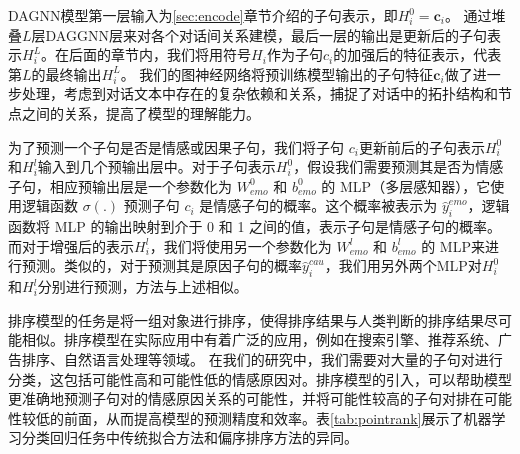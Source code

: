 DAGNN模型第一层输入为\ref{sec:encode}章节介绍的子句表示，即$H^0_i=\mathbf{c}_i$。 通过堆叠$L$层DAGGNN层来对各个对话间关系建模，最后一层的输出是更新后的子句表示$H^L_i$。在后面的章节内，我们将用符号$H_i$作为子句$c_i$的加强后的特征表示，代表第$L$的最终输出$H^L_i$。
我们的图神经网络将预训练模型输出的子句特征$\mathbf{c}_i$做了进一步处理，考虑到对话文本中存在的复杂依赖和关系，捕捉了对话中的拓扑结构和节点之间的关系，提高了模型的理解能力。

为了预测一个子句是否是情感或因果子句，我们将子句 $c_i$更新前后的子句表示$H^0_i$和$H^l_i$输入到几个预输出层中。对于子句表示$H^0_i$，假设我们需要预测其是否为情感子句，相应预输出层是一个参数化为 $W^0_{emo}$ 和 $b^0_{emo}$ 的 MLP（多层感知器），它使用逻辑函数 $\sigma(.)$ 预测子句 $c_i$ 是情感子句的概率。这个概率被表示为 $\hat{y}_i^{emo}$，逻辑函数将 MLP 的输出映射到介于 0 和 1 之间的值，表示子句是情感子句的概率。而对于增强后的表示$H^l_i$，我们将使用另一个参数化为 $W^l_{emo}$ 和 $b^l_{emo}$ 的 MLP来进行预测。类似的，对于预测其是原因子句的概率$\hat{y}_i^{cau}$，我们用另外两个MLP对$H^0_i$和$H^l_i$分别进行预测，方法与上述相似。



排序模型的任务是将一组对象进行排序，使得排序结果与人类判断的排序结果尽可能相似。排序模型在实际应用中有着广泛的应用，例如在搜索引擎、推荐系统、广告排序、自然语言处理等领域。
在我们的研究中，我们需要对大量的子句对进行分类，这包括可能性高和可能性低的情感原因对。排序模型的引入，可以帮助模型更准确地预测子句对的情感原因关系的可能性，并将可能性较高的子句对排在可能性较低的前面，从而提高模型的预测精度和效率。表\ref{tab:pointrank}展示了机器学习分类回归任务中传统拟合方法和偏序排序方法的异同。


